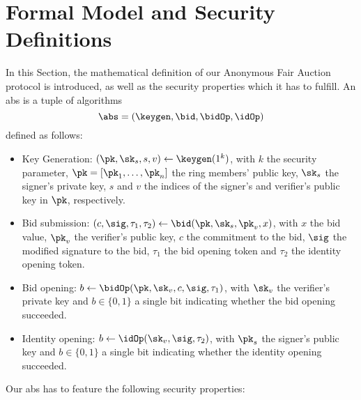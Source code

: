 \section{Formal Model and Security Definitions}
\label{sec-formal}
In this Section, the mathematical definition of our Anonymous Fair Auction protocol is introduced, as well as the security properties which it has to fulfill. An \gls{abs} is a tuple of \ppt algorithms
\begin{equation*}
    \abs=(\keygen,\bid,\bidOp,\idOp)
\end{equation*}
defined as follows:
\begin{itemize}
\item Key Generation: $(\pk, \sk_s,s,v)\gets \keygen(1^k)$, with $k$ the security parameter, $\pk=[\pk_1,\dots,\pk_n]$ the ring members' public key, $\sk_s$ the signer's private key, $s$ and $v$ the indices of the signer's and verifier's public key in $\pk$, respectively.
\item Bid submission: $(c, \sig, \tau_1, \tau_2)\gets\bid(\pk, \sk_s, \pk_v, x)$, with $x$ the bid value, $\pk_v$ the verifier's public key, $c$ the commitment to the bid, $\sig$ the modified signature to the bid, $\tau_1$ the bid opening token and $\tau_2$ the identity opening token.
\item Bid opening: $b\gets\bidOp(\pk, \sk_v, c, \sig, \tau_1)$, with $\sk_v$ the verifier's private key and $b\in\{0,1\}$ a single bit indicating whether the bid opening succeeded.
\item Identity opening: $b\gets\idOp(\sk_v, \sig, \tau_2)$, with $\pk_s$ the signer's public key and $b\in\{0,1\}$ a single bit indicating whether the identity opening succeeded.
\end{itemize}
Our \gls{abs} has to feature the following security properties:
